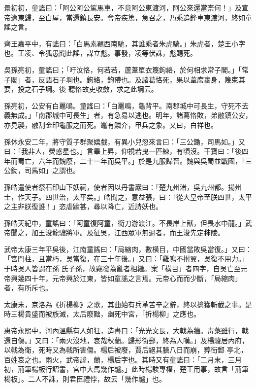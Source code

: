 \begin{pinyinscope}
 景初初，童謠曰：「阿公阿公駕馬車，不意阿公東渡河，阿公來還當柰何！」及宣帝遼東歸，至白屋，當還鎮長安。會帝疾篤，急召之，乃乘追鋒車東渡河，終如童謠之言。



 齊王嘉平中，有謠曰：「白馬素羈西南馳，其誰乘者朱虎騎。」朱虎者，楚王小字也。王凌、令狐愚聞此謠，謀立彪。事發，凌等伏誅，彪賜死。



 吳孫亮初，童謠曰；「吁汝恪，何若若，蘆葦單衣篾鉤絡，於何相求常子閣。」「常子閣」者，反語石子堈也。鉤絡，鉤帶也。及諸葛恪死，果以葦席裹身，篾束其要，投之石子堈。後
 聽恪故吏收斂，求之此堈云。



 孫亮初，公安有白鼉鳴。童謠曰：「白鼉鳴，龜背平。南郡城中可長生，守死不去義無成。」「南郡城中可長生」者，有急易以逃也。明年，諸葛恪敗，弟融鎮公安，亦見襲，融刮金印龜服之而死。鼉有鱗介，甲兵之象。又曰，白祥也。



 孫休永安二年，將守質子群聚嬉戲，有異小兒忽來言曰：「三公鋤，司馬如。」又曰：「我非人，熒惑星也。」言畢上昇，仰視若曳一匹練，有頃沒。干寶曰：「後四年而蜀亡，六年而魏廢，二十一年而吳平。」於是九服歸晉。魏與吳蜀並戰國，「三公鋤，司馬如」之謂也。



 孫皓遣使者祭石印山下妖祠，使者因以丹書巖曰：「楚九州渚，吳九州都。揚州士，作天子。四世治，太平矣。」皓聞之，意益張，曰：「從大皇帝至朕四世，太平之主非朕復誰！」恣虐踰甚，尋以降亡，近詩妖也。



 孫皓天紀中，童謠曰：「阿童復阿童，銜刀游渡江。不畏岸上獸，但畏水中龍。」武帝聞之，加王浚龍驤將軍。及征吳，江西眾軍無過者，而王浚先定秣陵。



 武帝太康三年平吳後，江南童謠曰：「局縮肉，數橫目，中國當敗吳當復。」又曰：「宮門柱，且當朽，吳當復，在三十年後。」又曰：「雞鳴不拊翼，吳復不用力。」于時吳人皆謂在孫
 氏子孫，故竊發為亂者相繼。案「橫目」者四字，自吳亡至元帝興幾四十年，元帝興於江東，皆如童謠之言焉。元帝心而而少斷，「局縮肉」者，有所斥也。



 太康末，京洛為《折楊柳》之歌，其曲始有兵革苦辛之辭，終以擒獲斬截之事。是時三楊貴盛而被族滅，太后廢黜，幽死中宮，「折楊柳」之應也。



 惠帝永熙中，河內溫縣有人如狂，造書曰：「光光文長，大戟為牆。毒藥雖行，戟還自傷。」又曰：「兩火沒地，哀哉秋蘭。歸形街郵，終為人嘆。」及楊駿居內府，以戟為衛，死時又為戟所害傷。楊后被廢，賈后絕其膳八日而崩，葬街郵
 亭北，百姓哀之也。雨火，武帝諱，蘭，楊后字也。其時又有童謠曰：「二月末，三月初，荊筆楊板行詔書，宮中大馬幾作驢。」此時楊駿專權，楚王用事，故言「荊筆楊板」。二人不誅，則君臣禮悖，故云「幾作驢」也。




\end{pinyinscope}

